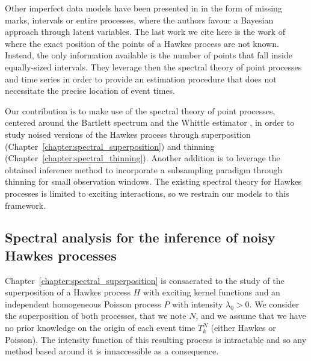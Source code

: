   Other imperfect data models have been presented in \textcite{Linderman2014} in the form of missing marks, intervals or entire processes, where the authors favour a Bayesian approach through latent variables. 
  The last work we cite here is the work of \textcite{Cheysson2022} where the exact position of the points of a Hawkes process are not known. 
  Instead, the only information available is the number of points that fall inside equally-sized intervals.
  They leverage then the spectral theory of point processes and time series in order to provide an estimation procedure that does not necessitate the precise location of event times.
  
  Our contribution is to make use of the spectral theory of point processes, centered around the Bartlett spectrum \parencite{Bartlett1964} and the Whittle estimator \parencite{Whittle1952}, in order to study noised versions of the Hawkes process through superposition (Chapter~\ref{chapter:spectral_superposition}) and thinning (Chapter~\ref{chapter:spectral_thinning}).
  Another addition is to leverage the obtained inference method to incorporate a subsampling paradigm through thinning for small observation windows.
  The existing spectral theory for Hawkes processes is limited to exciting interactions, so we restrain our models to this framework.
  
  




    \subsection{Spectral analysis for the inference of noisy Hawkes processes}
    Chapter~\ref{chapter:spectral_superposition} is consacrated to the study of the superposition of a Hawkes process $H$ with exciting kernel functions and an independent homogeneous Poisson process $P$ with intensity $\lambda_0 > 0$.
    We consider the superposition of both processes, that we note $N$,
    and we assume that we have no prior knowledge on the origin of each event time $T_k^N$ (either Hawkes or Poisson).
    The intensity function of this resulting process is intractable and so any method based around it is innaccessible as a consequence. 
    
